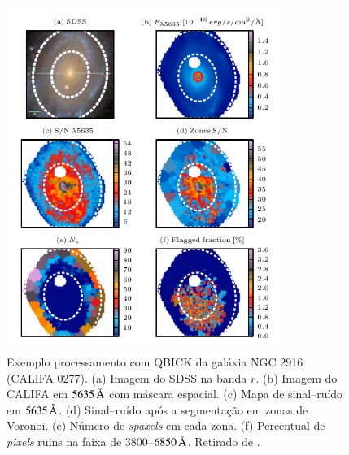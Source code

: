 \begin{figure}
	\includegraphics[width=0.8\textwidth]{figuras/zones-K0277}
	\caption[Exemplo processamento com QBICK, galáxia K0277]
	{Exemplo processamento com QBICK da galáxia NGC 2916 (CALIFA 0277). (a)
	Imagem do SDSS na banda $r$. (b) Imagem do CALIFA em $5635\,\text{\normalfont\AA}$ com máscara
	espacial. (c) Mapa de sinal--ruído em $5635\,\text{\normalfont\AA}$. (d) Sinal--ruído após
	a segmentação em zonas de Voronoi. (e) Número de {\em spaxels} em cada zona.
	(f) Percentual de {\em pixels} ruins na faixa de $3800$--$6850\,\text{\normalfont\AA}$.
	Retirado de \citet{CidFernandes2013}.}
	\label{fig:QBICK}
\end{figure}

\subsection{\starlight}
\label{sec:ifs:starlight}

